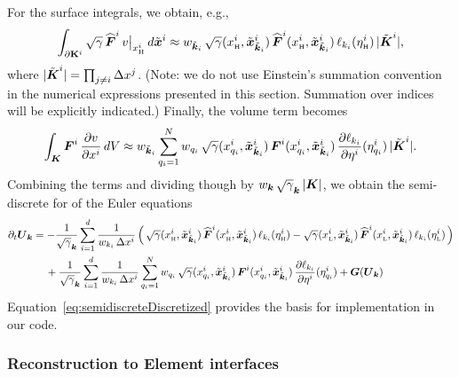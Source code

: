 \documentclass[10pt,preprint]{aastex}
\newcommand{\pbK}{\partial\mathbf{K}}
\begin{document}
For the surface integrals, we obtain, e.g., 
\begin{equation}
  \int_{\pbK^{i}}\sqrt{\gamma}\,\widehat{\vect{F}}^{i}\,v\big|_{\xH^{i}}\,d\tilde{\bx}^{i}
  \approx w_{\tilde{\bk}_{i}}\,\sqrt{\gamma}(x_{\Hgh}^{i},\tilde{\bx}_{\tilde{\bk}_{i}}^{i})\,\widehat{\bF}^{i}(x_{\Hgh}^{i},\tilde{\bx}_{\tilde{\bk}_{i}}^{i})\,\ell_{k_{i}}(\eta_{\Hgh}^{i})\,|\tilde{\bK}^{i}|,
\end{equation}
where $|\tilde{\boldsymbol{K}}^{i}|=\prod_{j\ne i}\Delta x^{j}$.  
(Note: we do not use Einstein's summation convention in the numerical expressions presented in this section.  
Summation over indices will be explicitly indicated.)  
Finally, the volume term becomes
\begin{equation}
  \int_{\boldsymbol{K}}\boldsymbol{F}^{i}\,\frac{\partial v}{\partial x^{i}}\,dV
  \approx w_{\tilde{\boldsymbol{k}}_{i}}\sum_{q_{i}=1}^{N}
  w_{q_{i}}\,\sqrt{\gamma}(x_{q_{i}}^{i},\tilde{\boldsymbol{x}}_{\tilde{\boldsymbol{k}}_{i}}^{i})\,\boldsymbol{F}^{i}(x_{q_{i}}^{i},\tilde{\boldsymbol{x}}_{\tilde{\boldsymbol{k}}_{i}}^{i})\,\frac{\partial \ell_{k_{i}}}{\partial \eta^{i}}(\eta_{q_{i}}^{i})\,|\tilde{\boldsymbol{K}}^{i}|.
\end{equation}
Combining the terms and dividing though by $w_{\boldsymbol{k}}\,\sqrt{\gamma}_{\boldsymbol{k}}\,|\boldsymbol{K}|$, we obtain the semi-discrete for of the Euler equations
\begin{align}
  \partial_{t}{}\boldsymbol{U}_{\boldsymbol{k}}
  &=
  -\frac{1}{\sqrt{\gamma}_{\boldsymbol{k}}}
  \sum_{i=1}^{d}\frac{1}{w_{k_{i}}\,\Delta x^{i}}\,
  \Big(\,
    \sqrt{\gamma}(x_{\mbox{\tiny H}}^{i},\tilde{\boldsymbol{x}}_{\tilde{\boldsymbol{k}}_{i}}^{i})\,\widehat{\boldsymbol{F}}^{i}(x_{\mbox{\tiny H}}^{i},\tilde{\boldsymbol{x}}_{\tilde{\boldsymbol{k}}_{i}}^{i})\,\ell_{k_{i}}(\eta_{\mbox{\tiny H}}^{i})
    -\sqrt{\gamma}(x_{\mbox{\tiny L}}^{i},\tilde{\boldsymbol{x}}_{\tilde{\boldsymbol{k}}_{i}}^{i})\,\widehat{\boldsymbol{F}}^{i}(x_{\mbox{\tiny L}}^{i},\tilde{\boldsymbol{x}}_{\tilde{\boldsymbol{k}}_{i}}^{i})\,\ell_{k_{i}}(\eta_{\mbox{\tiny L}}^{i})
  \,\Big) \nonumber \\
  &\hspace{12pt}
  +\frac{1}{\sqrt{\gamma}_{\boldsymbol{k}}}
  \sum_{i=1}^{d}\frac{1}{w_{k_{i}}\,\Delta x^{i}}\sum_{q_{i}=1}^{N}w_{q_{i}}\,\sqrt{\gamma}(x_{q_{i}}^{i},\tilde{\boldsymbol{x}}_{\tilde{\boldsymbol{k}}_{i}}^{i})\,\boldsymbol{F}^{i}(x_{q_{i}}^{i},\tilde{\boldsymbol{x}}_{\tilde{\boldsymbol{k}}_{i}}^{i})\,\frac{\partial \ell_{k_{i}}}{\partial \eta^{i}}(\eta_{q_{i}}^{i})
  +\boldsymbol{G}(\boldsymbol{U}_{\boldsymbol{k}})
  \label{eq:semidiscreteDiscretized}
\end{align}
Equation~\eqref{eq:semidiscreteDiscretized} provides the basis for implementation in our code.  

\subsubsection{Reconstruction to Element interfaces}
\end{document}
